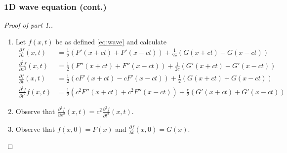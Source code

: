 \documentclass[aspectratio=169,handout]{beamer}
\begin{document}
\begin{frame}
    \frametitle{1D wave equation (cont.)}
    \begin{proof}[Proof of part 1.]
        \begin{enumerate}
            \item Let \(f(x,t)\) be as defined \eqref{eq:wave} and calculate
                  \[
                      \begin{aligned}
                          \tfrac{\partial f}{\partial x} (x,t)
                           & = \tfrac{1}{2} \left(F'(x+ct) + F'(x-ct)\right)
                          + \tfrac{1}{2c}\left(G(x+ct) - G(x-ct)\right)               \\
                          \tfrac{\partial^2 f}{\partial x^2}(x,t)
                           & = \tfrac{1}{2} \left(F''(x+ct) + F''(x-ct)\right)
                          + \tfrac{1}{2c}\left(G'(x+ct) - G'(x-ct)\right)             \\
                          \tfrac{\partial f}{\partial t} (x,t)
                           & = \tfrac{1}{2} \left(cF'(x+ct) - c F'(x-ct)\right)
                          + \tfrac{1}{2}\left(G(x+ct) + G(x-ct)\right)                \\
                          \tfrac{\partial^2 f}{\partial t^2} f(x,t)
                           & = \tfrac{1}{2} \left(c^2F''(x+ct) + c^2 F''(x-ct)\right)
                          + \tfrac{c}{2}\left(G'(x+ct) + G'(x-ct)\right)
                      \end{aligned}
                  \]
            \item Observe that  \(   \frac{\partial^2 f}{\partial x^2}(x,t) = c^2  \frac{\partial^2 f}{\partial t^2}(x,t) \).
            \item Observe that \(f(x,0) = F(x)\)
                  and \(\frac{\partial f}{\partial t}(x,0) = G(x)\).
        \end{enumerate}
    \end{proof}
\end{frame}
\end{document}
